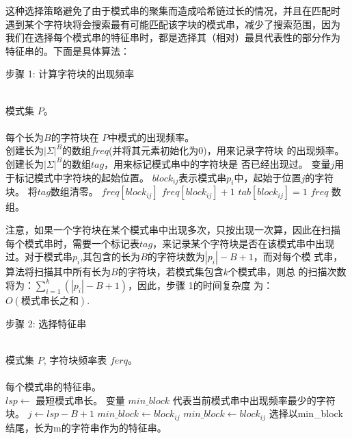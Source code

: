 这种选择策略避免了由于模式串的聚集而造成哈希链过长的情况，并且在匹配时
遇到某个字符块将会搜索最有可能匹配该字块的模式串，减少了搜索范围，因为
我们在选择每个模式串的特征串时，都是选择其（相对）最具代表性的部分作为
特征串的。下面是具体算法：

\begin{algorithm}
  \caption{步骤 1: 计算字符块的出现频率}
  \label{alg:block_freq}
  \begin{algorithmic}[1]
    \REQUIRE ~~\\
    模式集 $P$。 \\
    \ENSURE ~~\\
    每个长为$B$的字符块在 $P$中模式的出现频率。\\
    \STATE
    \STATE 创建长为$|\Sigma|^B$的数组$freq$(并将其元素初始化为0)，用来记录字符块
    的出现频率。
    \STATE 创建长为$|\Sigma|^B$的数组$tag$，用来标记模式串中的字符块是
    否已经出现过。
    \STATE 变量$j$用于标记模式中字符块的起始位置。
    \STATE $block_{ij}$表示模式串$p_i$中，起始于位置$j$的字符块。
    \STATE 将$tag$数组清零。
    \STATE $freq[block_{ij}]$ \leftarrow $freq[block_{ij}]+1$
    \STATE $tab[block_{ij}]=1$
    \ENDIF
    \ENDFOR
    \ENDFOR
    \STATE
    \RETURN $freq$ 数组。
  \end{algorithmic}
\end{algorithm}


注意，如果一个字符块在某个模式串中出现多次，只按出现一次算，因此在扫描
每个模式串时，需要一个标记表$tag$，来记录某个字符块是否在该模式串中出现
过。对于模式串$p_i$,其包含的长为$B$的字符块数为$|p_i|-B+1$，而对每个模
式串，算法将扫描其中所有长为$B$的字符块，若模式集包含$k$个模式串，则总
的扫描次数将为：$\sum_{i=1}^{k}(|p_i|-B+1)$，因此，步骤 1的时间复杂度
为：$O(模式串长之和)$.

\begin{algorithm}
  \caption{步骤 2: 选择特征串}
  \label{alg:choose_signature}
  \begin{algorithmic}[1]
    \REQUIRE ~~\\
    模式集 $P$, 字符块频率表 $ferq$。 \\
    \ENSURE ~~\\
    每个模式串的特征串。\\
    \STATE
    \STATE $lsp \leftarrow$ 最短模式串长。
    \STATE 变量 $min\_block$ 代表当前模式串中出现频率最少的字符块。
    \STATE 
    \STATE $j \leftarrow lsp-B+1$
    \STATE $min\_block \leftarrow block_{ij}$
    \STATE $min\_block \leftarrow block_{ij}$
    \STATE 选择以min\_block结尾，长为m的字符串作为的特征串。
    \ENDIF
    \ENDFOR
    \ENDFOR
  \end{algorithmic}
\end{algorithm}


